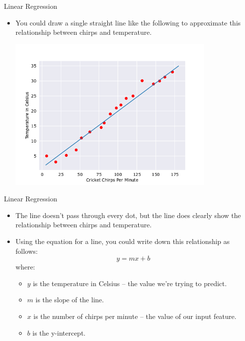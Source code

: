 \documentclass{beamer}
\begin{document}
\begin{frame}{Linear Regression}
\begin{itemize}
\item You could draw a single straight line like the following to approximate this relationship between chirps and temperature.

\includegraphics[width=0.8\textwidth]{images/CricketLine.png}    
\end{itemize}
\end{frame}


\begin{frame}{Linear Regression}
\begin{itemize}
\item The line doesn't pass through every dot, but the line does clearly show the relationship between chirps and temperature. 

\medskip
\item Using the equation for a line, you could write down this relationship as follows:
$$y = m x + b$$
where:

\medskip
\begin{itemize}
\item $y$ is the temperature in Celsius -- the value we're trying to predict.

\medskip
\item $m$ is the slope of the line.

\medskip
\item $x$ is the number of chirps per minute -- the value of our input feature.

\medskip
\item $b$ is the y-intercept.
\end{itemize}
\end{itemize}
\end{frame}
\end{document}
